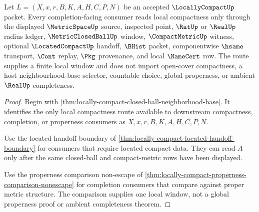 \begin{theorem}
\label{thm:locally-compact-completion-consumer-route}
Let $L=(X,x,r,B,K,A,H,C,P,N)$ be an accepted $\LocallyCompactUp$ packet. Every completion-facing consumer reads local compactness only through the displayed $\MetricSpaceUp$ source, inspected point, $\RatUp$ or $\RealUp$ radius ledger, $\MetricClosedBallUp$ window, $\CompactMetricUp$ witness, optional $\LocatedCompactUp$ handoff, $\BHist$ packet, componentwise $\hsame$ transport, $\Cont$ replay, $\Pkg$ provenance, and local $\NameCert$ row. The route supplies a finite local window and does not import open-cover compactness, a host neighbourhood-base selector, countable choice, global properness, or ambient $\RealUp$ completeness.
\end{theorem}
\begin{proof}
Begin with \autoref{thm:locally-compact-closed-ball-neighborhood-base}. It identifies the only local compactness route available to downstream compactness, completion, or properness consumers as $X,x,r,B,K,A,H,C,P,N$.

Use the located handoff boundary of \autoref{thm:locally-compact-located-handoff-boundary} for consumers that require located compact data. They can read $A$ only after the same closed-ball and compact-metric rows have been displayed.

Use the properness comparison non-escape of \autoref{thm:locally-compact-properness-comparison-nonescape} for completion consumers that compare against proper metric structure. The comparison supplies one local window, not a global properness proof or ambient completeness theorem.
\end{proof}

